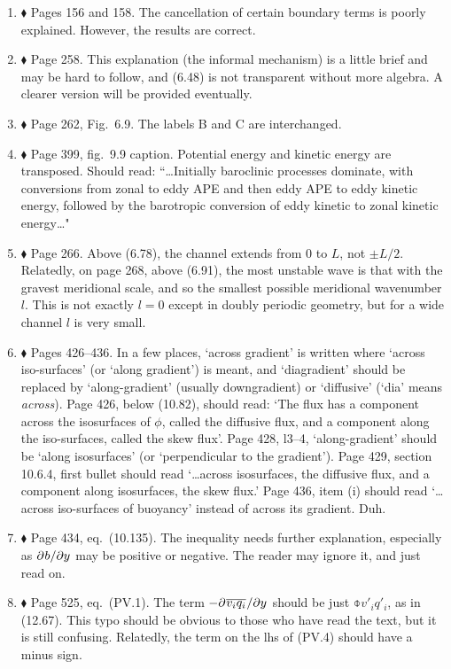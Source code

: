 \documentclass[10pt]{article}
\newcommand{\eq}{eq.\ } \newcommand{\Eq}{Eq.\ }
\renewcommand{\star}{\ensuremath{\blacklozenge} }
\begin{document}
\begin{enumerate}

\item \star \label{cancel} Pages 156 and 158. The cancellation of certain boundary terms is poorly explained. However, the results are correct. 

\item \star \label{informal} Page 258. This explanation (the informal mechanism) is a little brief and may be hard to follow, and (6.48) is not transparent without more algebra. A clearer version will be provided eventually. 

\item \star \label{eadyschem} Page 262, Fig.\ 6.9. The labels {\sf B} and {\sf C} are interchanged. 

\item \star \label{simmhosk} Page 399, fig.\ 9.9 caption.  Potential energy and kinetic energy are transposed. Should read: ``\ldots Initially baroclinic processes dominate, with conversions from zonal to eddy APE and then eddy APE to eddy kinetic energy, followed by the barotropic conversion of eddy kinetic to zonal kinetic energy\ldots"

\item \star \label{channel} Page 266. Above (6.78), the channel extends from $0$ to $L$, not $\pm L/2$. Relatedly, on page 268, above (6.91), the most unstable wave is that with the gravest meridional scale, and so the smallest possible meridional wavenumber $l$. This is not exactly $l=0$ except in doubly periodic geometry, but for a wide channel $l$ is very small.

\item \star Pages 426--436. In a few places, `across gradient' is written where `across iso-surfaces' (or `along gradient') is meant, and  `diagradient' should be replaced by `along-gradient' (usually downgradient) or `diffusive' (`dia' means \emph{across}). Page 426, below (10.82), should read: `The flux has a component across the isosurfaces of $\phi$, called the diffusive flux, and a component along the iso-surfaces, called the skew flux'. Page 428, l3--4, `along-gradient' should be `along isosurfaces' (or `perpendicular to the gradient'). Page 429, section 10.6.4, first bullet should read `\ldots across isosurfaces, the diffusive flux, and a component along isosurfaces, the skew flux.'  Page 436, item (i) should read `\ldots across iso-surfaces of buoyancy' instead of across its gradient. Duh.

\item \star Page 434, \eq (10.135). The inequality needs further explanation, especially as ${\partial^{} b / \partial y^{}} $ may be positive or negative.  The reader may ignore it, and just read on.

\item \star Page 525, \eq (PV.1). The term $-{\partial^{} \overline{v_i q_i}^{} / \partial y^{}}$ should be just $\obar{v'_i q'_i}$, as in (12.67). This typo should be obvious to those who have read the text, but it is still confusing. Relatedly, the term on the lhs of (PV.4) should have a minus sign.

\end{enumerate}
\end{document}
